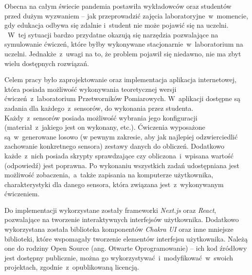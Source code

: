 Obecna na całym świecie pandemia postawiła wykładowców oraz studentów przed dużym wyzwaniem -- jak
przeprowadzić zajęcia laboratoryjne~w~momencie, gdy edukacja odbywa się zdalnie i~student nie może
pojawić się na uczelni.
~W~tej sytuacji bardzo przydatne okazują się narzędzia pozwalające na symulowanie ćwiczeń, które
byłby wykonywane stacjonarnie~w~laboratorium na uczelni. Jednakże~z~uwagi na to, że
problem pojawił się niedawno, nie ma zbyt wielu dostępnych rozwiązań.

Celem pracy było zaprojektowanie oraz implementacja aplikacja internetowej, która posiada możliwość
wykonywania teoretycznej wersji ćwiczeń~z~laboratorium Przetworników Pomiarowych. W~aplikacji
dostępne są zadania dla każdego~z~sensorów, do wykonania przez studenta. Każdy~z~sensorów posiada
możliwość wybrania jego konfiguracji (materiał~z~jakiego jest on wykonany, etc.). Ćwiczenia
wyposażone są~w~generowane losowo (w pewnym zakresie, aby jak najlepiej odzwierciedlić zachowanie
konkretnego sensora) zestawy danych do obliczeń. Dodatkowo każde~z~nich posiada skrypty sprawdzające
czy obliczona~i~wpisana wartość (odpowiedź) jest poprawna. Po wykonaniu wszystkich zadań
udostępniana jest możliwość zobaczenia,~a~także zapisania na komputerze użytkownika, charakterystyki
dla danego sensora, która związana jest~z~wykonywanym ćwiczeniem.

Do implementacji wykorzystane zostały frameworki \textit{Next.js} oraz \textit{React}, pozwalające
na tworzenie interaktywnych interfejsów użytkownika. Dodatkowo wykorzystana została biblioteka
komponentów \textit{Chakra UI} oraz inne mniejsze biblioteki, które wspomagały tworzenie elementów
interfejsu użytkownika. Należą one do rodziny Open Source (ang. Otwarte Oprogramowanie) -- ich kod
źródłowy jest dostępny publicznie, można go wykorzystywać~i~modyfikować~w~swoich projektach,
zgodnie~z~opublikowaną licencją.
